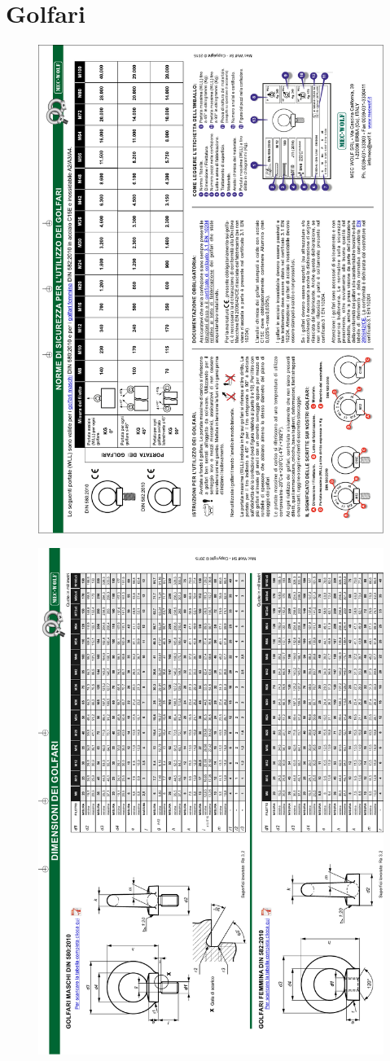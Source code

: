 \documentclass[11pt]{article}
\begin{document}
\section{Golfari}
\begin{figure}[h!]
\centering
  \includegraphics[width=.9\textwidth]{imgs/Golf1}
\end{figure}
\begin{figure}[h!]
\centering
  \includegraphics[width=.9\textwidth]{imgs/Golf2}
\end{figure}
\end{document}
